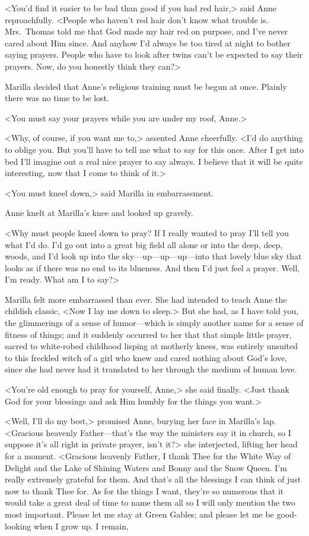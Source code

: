 <You'd find it easier to be bad than good if you had red hair,> said Anne reproachfully. <People who haven't red hair don't know what trouble is. Mrs.~Thomas told me that God made my hair red on purpose, and I've never cared about Him since. And anyhow I'd always be too tired at night to bother saying prayers. People who have to look after twins can't be expected to say their prayers. Now, do you honestly think they can?>

Marilla decided that Anne's religious training must be begun at once. Plainly there was no time to be lost.

<You must say your prayers while you are under my roof, Anne.>

<Why, of course, if you want me to,> assented Anne cheerfully. <I'd do anything to oblige you. But you'll have to tell me what to say for this once. After I get into bed I'll imagine out a real nice prayer to say always. I believe that it will be quite interesting, now that I come to think of it.>

<You must kneel down,> said Marilla in embarrassment.

Anne knelt at Marilla's knee and looked up gravely.

<Why must people kneel down to pray? If I really wanted to pray I'll tell you what I'd do. I'd go out into a great big field all alone or into the deep, deep, woods, and I'd look up into the sky—up—up—up—into that lovely blue sky that looks as if there was no end to its blueness. And then I'd just feel a prayer. Well, I'm ready. What am I to say?>

Marilla felt more embarrassed than ever. She had intended to teach Anne the childish classic, <Now I lay me down to sleep.> But she had, as I have told you, the glimmerings of a sense of humor—which is simply another name for a sense of fitness of things; and it suddenly occurred to her that that simple little prayer, sacred to white-robed childhood lisping at motherly knees, was entirely unsuited to this freckled witch of a girl who knew and cared nothing about God's love, since she had never had it translated to her through the medium of human love.

<You're old enough to pray for yourself, Anne,> she said finally. <Just thank God for your blessings and ask Him humbly for the things you want.>

<Well, I'll do my best,> promised Anne, burying her face in Marilla's lap. <Gracious heavenly Father—that's the way the ministers say it in church, so I suppose it's all right in private prayer, isn't it?> she interjected, lifting her head for a moment. <Gracious heavenly Father, I thank Thee for the White Way of Delight and the Lake of Shining Waters and Bonny and the Snow Queen. I'm really extremely grateful for them. And that's all the blessings I can think of just now to thank Thee for. As for the things I want, they're so numerous that it would take a great deal of time to name them all so I will only mention the two most important. Please let me stay at Green Gables; and please let me be good-looking when I grow up. I remain,

